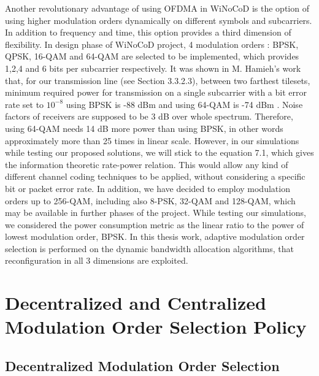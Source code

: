 Another revolutionary advantage of using OFDMA in WiNoCoD is the option of using higher modulation orders dynamically on different symbols and subcarriers. In addition to frequency and time, this option provides a third dimension of flexibility. In design phase of WiNoCoD project, 4 modulation orders : BPSK, QPSK, 16-QAM and 64-QAM are selected to be implemented, which provides 1,2,4 and 6 bits per subcarrier respectively. It was shown in M. Hamieh's work that, for our transmission line (see Section 3.3.2.3), between two farthest tilesets, minimum required power for transmission on a single subcarrier with a bit error rate set to $10^{-8}$ using BPSK is -88 dBm and using 64-QAM is -74 dBm \cite{hamieh2014sizing}. Noise factors of receivers are supposed to be 3 dB over whole spectrum. Therefore, using 64-QAM needs 14 dB more power than using BPSK, in other words approximately more than 25 times in linear scale. However, in our simulations while testing our proposed solutions, we will stick to the equation 7.1, which gives the information theoretic rate-power relation. This would allow any kind of different channel coding techniques to be applied, without considering a specific bit or packet error rate. In addition, we have decided to employ modulation orders up to 256-QAM, including also 8-PSK, 32-QAM and 128-QAM, which may be available in further phases of the project. While testing our simulations, we considered the power consumption metric as the linear ratio to the power of lowest modulation order, BPSK. In this thesis work, adaptive modulation order selection is performed on the dynamic bandwidth allocation algorithms, that reconfiguration in all 3 dimensions are exploited.


\section{Decentralized and Centralized Modulation Order Selection Policy}

\subsection{Decentralized Modulation Order Selection}

